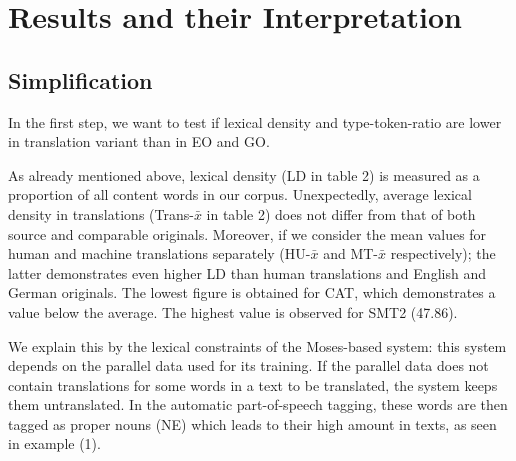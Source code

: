 \documentclass[output=paper]{LSP/langsci}
\begin{document}
\section{Results and their Interpretation} 
\subsection{Simplification}
In the first step, we want to test if lexical density and type-token-ratio are lower in translation variant than in EO and GO.

\begin{table}
     \centering
 \caption{STTR and LD in VARTRA-SMALL}
     \label{4.2}
\end{table}

As already mentioned above, lexical density (LD in table 2) is measured as a proportion of all content words in our corpus. Unexpectedly, average lexical density in translations (Trans-$\bar{x}$ in table 2) does not differ from that of both source and comparable originals. Moreover, if we consider the mean values for human and machine translations separately (HU-$\bar{x}$ and MT-$\bar{x}$ respectively); the latter demonstrates even higher LD than human translations and English and German originals. The lowest figure is obtained for CAT, which demonstrates a value below the average. The highest value is observed for SMT2 (47.86).

We explain this by the lexical constraints of the Moses-based system: this system depends on the parallel data used for its training.  If the parallel data does not contain translations for some words in a text to be translated, the system keeps them untranslated. In the automatic part-of-speech tagging, these words are then tagged as proper nouns (NE) which leads to their high amount in texts, as seen in example (1).
\end{document}
